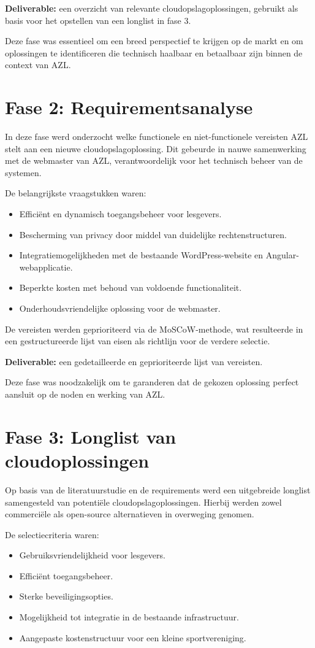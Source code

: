 \textbf{Deliverable:} een overzicht van relevante cloudopslagoplossingen, gebruikt als basis voor het opstellen van een longlist in fase 3.

Deze fase was essentieel om een breed perspectief te krijgen op de markt en om oplossingen te identificeren die technisch haalbaar en betaalbaar 
zijn binnen de context van AZL.

\section{Fase 2: Requirementsanalyse}
In deze fase werd onderzocht welke functionele en niet-functionele vereisten AZL stelt aan een nieuwe cloudopslagoplossing. Dit gebeurde in nauwe samenwerking met de 
webmaster van AZL, verantwoordelijk voor het technisch beheer van de systemen.

De belangrijkste vraagstukken waren:
\begin{itemize}
    \item Efficiënt en dynamisch toegangsbeheer voor lesgevers.
    \item Bescherming van privacy door middel van duidelijke rechtenstructuren.
    \item Integratiemogelijkheden met de bestaande WordPress-website en Angular-webapplicatie.
    \item Beperkte kosten met behoud van voldoende functionaliteit.
    \item Onderhoudsvriendelijke oplossing voor de webmaster.
\end{itemize}

De vereisten werden geprioriteerd via de MoSCoW-methode, wat resulteerde in een gestructureerde lijst van eisen als richtlijn voor de verdere selectie.

\textbf{Deliverable:} een gedetailleerde en geprioriteerde lijst van vereisten.

Deze fase was noodzakelijk om te garanderen dat de gekozen oplossing perfect aansluit op de noden en werking van AZL.

\section{Fase 3: Longlist van cloudoplossingen}
Op basis van de literatuurstudie en de requirements werd een uitgebreide longlist samengesteld van potentiële cloudopslagoplossingen. Hierbij werden zowel commerciële 
als open-source alternatieven in overweging genomen.

De selectiecriteria waren:
\begin{itemize}
    \item Gebruiksvriendelijkheid voor lesgevers.
    \item Efficiënt toegangsbeheer.
    \item Sterke beveiligingsopties.
    \item Mogelijkheid tot integratie in de bestaande infrastructuur.
    \item Aangepaste kostenstructuur voor een kleine sportvereniging.
\end{itemize}


